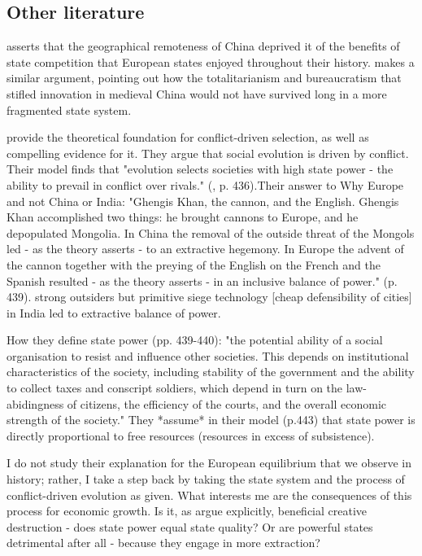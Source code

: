 \documentclass{article}
\begin{document}
\subsection*{Other literature}

\cite{diamond1997} asserts that the geographical remoteness of China deprived it of the benefits of state competition that European states enjoyed throughout their history. \cite{landes2006} makes a similar argument, pointing out how the totalitarianism and bureaucratism that stifled innovation in medieval China would not have survived long in a more fragmented state system.

\cite{levine2013, levine2021} provide the theoretical foundation for conflict-driven selection, as well as compelling evidence for it. 
They argue that social evolution is driven by conflict. Their model finds that "evolution selects societies with high state power - the ability to prevail in conflict over rivals." (\citealp{levine2021}, p. 436).Their answer to Why Europe and not China or India: "Ghengis Khan, the cannon, and the English. Ghengis Khan accomplished two things: he brought cannons to Europe, and he depopulated Mongolia. In China the removal of the outside threat of the Mongols led - as the theory asserts - to an extractive hegemony. In Europe the advent of the cannon together with the preying of the English on the French and the Spanish resulted - as the theory asserts - in an inclusive balance of power." (p. 439). strong outsiders but primitive siege technology [cheap defensibility of cities] in India led to extractive balance of power.  


How they define state power (pp. 439-440): "the potential ability of a social organisation to resist and influence other societies. This depends on institutional characteristics of the society, including stability of the government and the ability to collect taxes and conscript soldiers, which depend in turn on the law-abidingness of citizens, the efficiency of the courts, and the overall economic strength of the society." They *assume* in their model (p.443) that state power is directly proportional to free resources (resources in excess of subsistence).


I do not study their explanation for the European equilibrium that we observe in history; rather, I take a step back by taking the state system and the process of conflict-driven evolution as given. What interests me are the consequences of this process for economic growth.
Is it, as \cite{schoenholzer2022} argue explicitly, beneficial creative destruction - does state power equal state quality? Or are powerful states detrimental after all - because they engage in more extraction? \cite{tilly1985}
\end{document}

